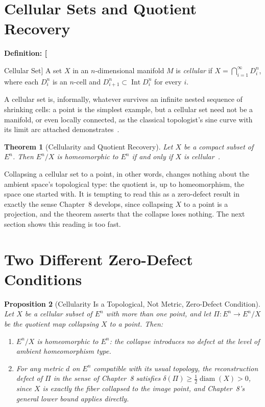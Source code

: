 \documentclass[11pt,fleqn]{book}
\numberwithin{equation}{chapter}
\newenvironment{definition}[1]
  {\begin{definitionEnv}
   \noindent\textbf{Definition: #1}\par\smallskip}
  {\end{definitionEnv}}
\theoremstyle{plain}
\newtheorem{theorem}{Theorem}[chapter]
\newtheorem{proposition}[theorem]{Proposition}
\theoremstyle{definition}
\theoremstyle{remark}
\begin{document}
\section{Cellular Sets and Quotient Recovery}

\begin{definition}[Cellular Set]
A set \(X\) in an \(n\)-dimensional manifold \(M\) is \emph{cellular} if \(X=\bigcap_{i=1}^\infty D_i^n\), where each \(D_i^n\) is an \(n\)-cell and \(D_{i+1}^n\subset\operatorname{Int}D_i^n\) for every \(i\).
\end{definition}

A cellular set is, informally, whatever survives an infinite nested sequence of shrinking cells: a point is the simplest example, but a cellular set need not be a manifold, or even locally connected, as the classical topologist's sine curve with its limit arc attached demonstrates~\cite{davermanvenema2009}.

\begin{theorem}[Cellularity and Quotient Recovery]
Let \(X\) be a compact subset of \(E^n\). Then \(E^n/X\) is homeomorphic to \(E^n\) if and only if \(X\) is cellular~\cite{davermanvenema2009}.
\end{theorem}

Collapsing a cellular set to a point, in other words, changes nothing about the ambient space's topological type: the quotient is, up to homeomorphism, the space one started with. It is tempting to read this as a zero-defect result in exactly the sense Chapter~8 develops, since collapsing \(X\) to a point is a projection, and the theorem asserts that the collapse loses nothing. The next section shows this reading is too fast.

\section{Two Different Zero-Defect Conditions}

\begin{proposition}[Cellularity Is a Topological, Not Metric, Zero-Defect Condition]
Let \(X\) be a cellular subset of \(E^n\) with more than one point, and let \(\Pi:E^n\to E^n/X\) be the quotient map collapsing \(X\) to a point. Then:
\begin{enumerate}
\item \(E^n/X\) is homeomorphic to \(E^n\): the collapse introduces no defect at the level of ambient homeomorphism type.
\item For any metric \(d\) on \(E^n\) compatible with its usual topology, the reconstruction defect of \(\Pi\) in the sense of Chapter~8 satisfies \(\delta(\Pi)\geq \tfrac12\operatorname{diam}(X) > 0\), since \(X\) is exactly the fiber collapsed to the image point, and Chapter~8's general lower bound applies directly.
\end{enumerate}
\end{proposition}
\end{document}
